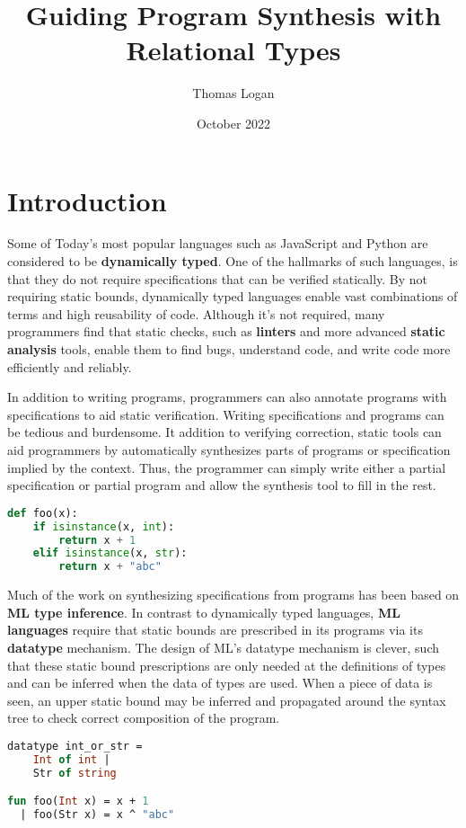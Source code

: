 \documentclass[manuscript]{acmart}
\title{Guiding Program Synthesis with Relational Types}
\author{Thomas Logan}
\date{October 2022}
\begin{document}
\maketitle

\section{Introduction}
Some of Today's most popular languages such as JavaScript and Python are considered to be \textbf{dynamically typed}.
One of the hallmarks of such languages, is that they do not require specifications 
that can be verified statically. By not requiring static bounds, dynamically typed languages
enable vast combinations of terms and high reusability of code. 
Although it's not required, many programmers find that
static checks, such as \textbf{linters} and more advanced \textbf{static analysis} tools, 
enable them to find bugs, understand code, and write code more efficiently and reliably. 

In addition to writing programs, programmers can also annotate programs with specifications to
aid static verification. Writing specifications and programs can be tedious and burdensome.  
It addition to verifying correction, static tools can aid programmers by automatically synthesizes
parts of programs or specification implied by the context. Thus, the programmer can simply write
either a partial specification or partial program and allow the synthesis tool to fill in the rest.   

\begin{lstlisting}[language=Python]
def foo(x):
    if isinstance(x, int):
        return x + 1 
    elif isinstance(x, str): 
        return x + "abc"
\end{lstlisting}

Much of the work on synthesizing specifications from programs has been based on \textbf{ML type inference}.
In contrast to dynamically typed languages, \textbf{ML languages} require that static bounds are prescribed 
in its programs via its \textbf{datatype} mechanism. The design of ML's datatype mechanism is clever, 
such that these static bound prescriptions are only needed at the definitions of types and can be 
inferred when the data of types are used. When a piece of data is seen, an upper static bound 
may be inferred and propagated around the syntax tree to check correct composition of the program.

\begin{lstlisting}[language=ML]
datatype int_or_str = 
    Int of int | 
    Str of string

fun foo(Int x) = x + 1
  | foo(Str x) = x ^ "abc"
\end{lstlisting}
\end{document}
